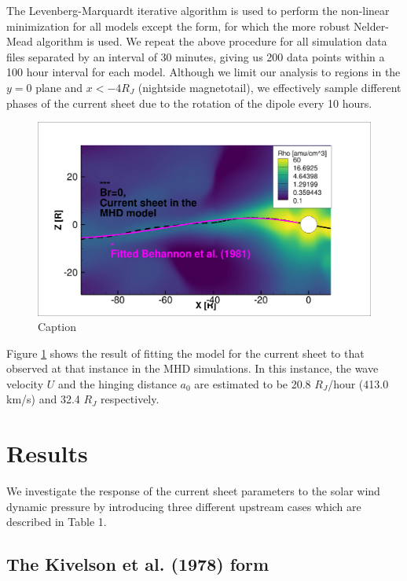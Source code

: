 The Levenberg-Marquardt iterative algorithm is used to perform the non-linear minimization for all models except the \cite{Kivelson1978ASheet} form, for which the more robust Nelder-Mead algorithm is used. We repeat the above procedure for all simulation data files separated by an interval of 30 minutes, giving us 200 data points within a 100 hour interval for each model. Although we limit our analysis to regions in the $y=0$ plane and $x < -4 R_J$ (nightside magnetotail), we effectively sample different phases of the current sheet due to the rotation of the dipole every 10 hours.

\begin{figure}
    \centering
    \includegraphics[width=\textwidth]{images6/CurrentSheet_fitted.png}
    \caption{Caption}
    \label{fig:example-fitcurrentsheet}
\end{figure}

Figure \ref{fig:example-fitcurrentsheet} shows the result of fitting the  model for the current sheet to that observed at that instance in the MHD simulations. In this instance, the wave velocity $U$ and the hinging distance $a_0$ are estimated to be 20.8 $R_J$/hour (413.0 km/s) and 32.4 $R_J$ respectively. 

\section{Results}

We investigate the response of the current sheet parameters to the solar wind dynamic pressure by introducing three different upstream cases which are described in Table 1. 

\subsection{The Kivelson et al. (1978) form}

